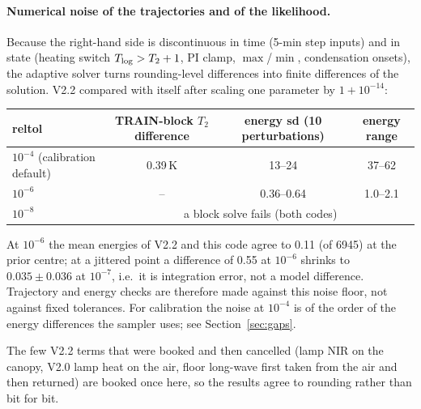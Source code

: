 \paragraph{Numerical noise of the trajectories and of the likelihood.} Because the right-hand side is discontinuous in
time (5-min step inputs) and in state (heating switch $T_{\rm log}>T_2+1$, PI clamp, $\max$/$\min$, condensation onsets),
the adaptive solver turns rounding-level differences into finite differences of the solution. V2.2 compared with itself
after scaling one parameter by $1+10^{-14}$:
\begin{center}\small
\begin{tabular}{lccc}\toprule
reltol & TRAIN-block $T_2$ difference & energy sd (10 perturbations) & energy range\\\midrule
$10^{-4}$ (calibration default) & 0.39\,K & 13--24 & 37--62\\
$10^{-6}$ & -- & 0.36--0.64 & 1.0--2.1\\
$10^{-8}$ & \multicolumn{3}{c}{a block solve fails (both codes)}\\\bottomrule
\end{tabular}
\end{center}
At $10^{-6}$ the mean energies of V2.2 and this code agree to 0.11 (of 6945) at the prior centre; at a jittered point a difference of 0.55 at $10^{-6}$ shrinks to $0.035\pm0.036$ at $10^{-7}$, i.e.\ it is integration error, not a model difference. Trajectory and energy checks are therefore
made against this noise floor, not against fixed tolerances. For calibration the noise at $10^{-4}$ is of the order of the
energy differences the sampler uses; see Section~\ref{sec:gaps}.

The few V2.2 terms that were booked and then cancelled (lamp NIR on the canopy, V2.0 lamp heat on the air, floor
long-wave first taken from the air and then returned) are booked once here, so the results agree to rounding rather
than bit for bit.


